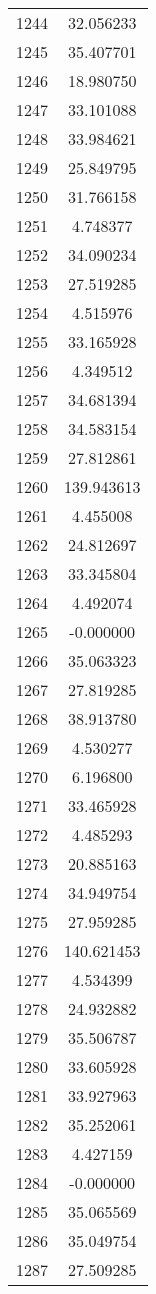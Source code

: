 \documentclass[12pt]{article}
\begin{document}
\begin{longtable}{@{}cc@{}}
1244 & 32.056233 \\
1245 & 35.407701 \\
1246 & 18.980750 \\
1247 & 33.101088 \\
1248 & 33.984621 \\
1249 & 25.849795 \\
1250 & 31.766158 \\
1251 & 4.748377 \\
1252 & 34.090234 \\
1253 & 27.519285 \\
1254 & 4.515976 \\
1255 & 33.165928 \\
1256 & 4.349512 \\
1257 & 34.681394 \\
1258 & 34.583154 \\
1259 & 27.812861 \\
1260 & 139.943613 \\
1261 & 4.455008 \\
1262 & 24.812697 \\
1263 & 33.345804 \\
1264 & 4.492074 \\
1265 & -0.000000 \\
1266 & 35.063323 \\
1267 & 27.819285 \\
1268 & 38.913780 \\
1269 & 4.530277 \\
1270 & 6.196800 \\
1271 & 33.465928 \\
1272 & 4.485293 \\
1273 & 20.885163 \\
1274 & 34.949754 \\
1275 & 27.959285 \\
1276 & 140.621453 \\
1277 & 4.534399 \\
1278 & 24.932882 \\
1279 & 35.506787 \\
1280 & 33.605928 \\
1281 & 33.927963 \\
1282 & 35.252061 \\
1283 & 4.427159 \\
1284 & -0.000000 \\
1285 & 35.065569 \\
1286 & 35.049754 \\
1287 & 27.509285 \\

\end{longtable}
\end{document}
